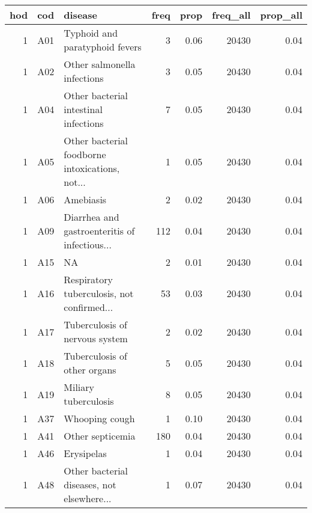 \begin{tabular}{rllrrrr}
  \toprule
 hod & cod & disease & freq & prop & freq\_all & prop\_all \\ 
  \midrule
    1 & A01 & Typhoid and paratyphoid fevers &   3 & 0.06 & 20430 & 0.04 \\ 
    1 & A02 & Other salmonella infections &   3 & 0.05 & 20430 & 0.04 \\ 
    1 & A04 & Other bacterial intestinal infections &   7 & 0.05 & 20430 & 0.04 \\ 
    1 & A05 & Other bacterial foodborne intoxications, not... &   1 & 0.05 & 20430 & 0.04 \\ 
    1 & A06 & Amebiasis &   2 & 0.02 & 20430 & 0.04 \\ 
    1 & A09 & Diarrhea and gastroenteritis of infectious... & 112 & 0.04 & 20430 & 0.04 \\ 
    1 & A15 & NA &   2 & 0.01 & 20430 & 0.04 \\ 
    1 & A16 & Respiratory tuberculosis, not confirmed... &  53 & 0.03 & 20430 & 0.04 \\ 
    1 & A17 & Tuberculosis of nervous system &   2 & 0.02 & 20430 & 0.04 \\ 
    1 & A18 & Tuberculosis of other organs &   5 & 0.05 & 20430 & 0.04 \\ 
    1 & A19 & Miliary tuberculosis &   8 & 0.05 & 20430 & 0.04 \\ 
    1 & A37 & Whooping cough &   1 & 0.10 & 20430 & 0.04 \\ 
    1 & A41 & Other septicemia & 180 & 0.04 & 20430 & 0.04 \\ 
    1 & A46 & Erysipelas &   1 & 0.04 & 20430 & 0.04 \\ 
    1 & A48 & Other bacterial diseases, not elsewhere... &   1 & 0.07 & 20430 & 0.04 \\ 
   \bottomrule
\end{tabular}
